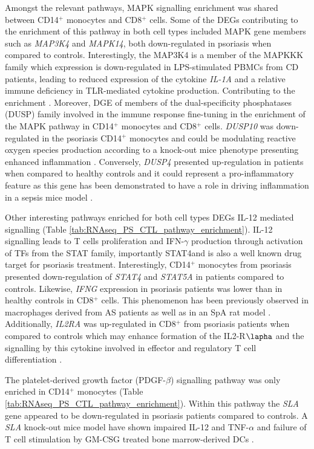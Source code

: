 Amongst the relevant pathways, MAPK signalling enrichment was shared between CD14$^+$ monocytes and CD8$^+$ cells. Some of the DEGs contributing to the enrichment of this pathway in both cell types included MAPK gene members such as \textit{MAP3K4} and \textit{MAPK14}, both down-regulated in psoriasis when compared to controls. Interestingly, the MAP3K4 is a member of the MAPKKK family which expression is down-regulated in LPS-stimulated PBMCs from CD patients, leading to reduced expression of the cytokine \textit{IL-1A} and a relative immune deficiency in TLR-mediated cytokine production. Contributing to the enrichment \parencite{Kraan2012}. Moreover, DGE of members of the dual-specificity phosphatases (DUSP) family involved in the immune response fine-tuning \parencite{Qian2009} in the enrichment of the MAPK pathway in CD14$^+$ monocytes and CD8$^+$ cells. \textit{DUSP10} was down-regulated in the psoriasis CD14$^+$ monocytes and could be modulating reactive oxygen species production according to a knock-out mice phenotype presenting enhanced inflammation . Conversely, \textit{DUSP4} presented up-regulation in patients when compared to healthy controls and it could represent a pro-inflammatory feature as this gene has been demonstrated to have a role in driving inflammation in a sepsis mice model \parencite{Cornell2010}.  

Other interesting pathways enriched for both cell types DEGs IL-12 mediated signalling (Table \ref{tab:RNAseq_PS_CTL_pathway_enrichment}). IL-12 signalling leads to T cells proliferation and IFN-$\gamma$ production through activation of TFs from the STAT family, importantly STAT4and is also a well known drug target for psoriasis treatment. Interestingly, CD14$^+$ monocytes from psoriasis presented down-regulation of \textit{STAT4} and \textit{STAT5A} in patients compared to controls. Likewise, \textit{IFNG} expression in psoriasis patients was lower than in healthy controls in CD8$^+$ cells. This phenomenon has been previously observed in macrophages derived from AS patients as well as in an SpA rat model \parencite{Smith2008,Fert2014}. Additionally, \textit{IL2RA} was up-regulated in CD8$^+$ from psoriasis patients when compared to controls which may enhance formation of the IL2-R$\lapha$ and the signalling by this cytokine involved in effector and regulatory T cell differentiation \parencite{Malek2010}.


The platelet-derived growth factor (PDGF-$\beta$) signalling pathway was only enriched in CD14$^+$ monocytes (Table \ref{tab:RNAseq_PS_CTL_pathway_enrichment}). Within this pathway the \textit{SLA} gene appeared to be down-regulated in psoriasis patients compared to controls. A \textit{SLA} knock-out mice model have shown impaired IL-12 and TNF-$\alpha$ and failure of T cell stimulation by GM-CSG treated bone marrow-derived DCs \parencite{Liontos2011}.

